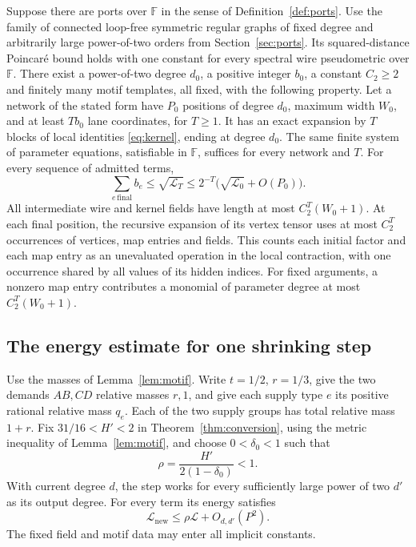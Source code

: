 \begin{theorem}\label{thm:compressor}
Suppose there are ports over $\mathbb F$ in the sense of
Definition~\ref{def:ports}. Use the family of connected loop-free symmetric regular
graphs of fixed degree and arbitrarily large power-of-two orders from
Section~\ref{sec:ports}. Its squared-distance Poincar\'e bound holds
with one constant for every spectral wire pseudometric over $\mathbb F$.
There exist a
power-of-two degree $d_0$, a positive integer $b_0$, a constant $C_2\ge2$
and finitely many motif templates, all fixed, with the following property.
Let a network of the stated form have $P_0$ positions of degree $d_0$,
maximum width $W_0$, and at least $Tb_0$ lane coordinates, for $T\ge1$.
It has an exact expansion by $T$ blocks of local identities
\eqref{eq:kernel}, ending at degree $d_0$. The same finite system of
parameter equations, satisfiable in $\mathbb F$, suffices for every network and $T$.
For every sequence of admitted terms,
\begin{equation}\label{eq:compress-bound}
  \sum_{e\,\mathrm{final}} b_e\le\sqrt{\mathcal L_T}
  \le 2^{-T}\big(\sqrt{\mathcal L_0}+O(P_0)\big).
\end{equation}
All intermediate wire and kernel fields have length at most
$C_2^T(W_0+1)$. At each final position, the recursive expansion of its
vertex tensor uses at most $C_2^T$ occurrences of vertices, map entries
and fields. This counts each initial factor and each map entry as an
unevaluated operation in the local contraction, with one occurrence
shared by all values of its hidden indices. For fixed arguments, a nonzero map entry contributes
a monomial of parameter degree at most $C_2^T(W_0+1)$.
\end{theorem}



\subsection{The energy estimate for one shrinking step}\label{subsec:shrink}

Use the masses of Lemma~\ref{lem:motif}. Write $t=1/2$, $r=1/3$, give the
two demands $AB,CD$ relative masses $r,1$, and give each supply type $e$ its
positive rational relative mass $q_e$. Each of the two supply groups has
total relative mass $1+r$. Fix $31/16<H'<2$ in Theorem~\ref{thm:conversion},
using the metric inequality of Lemma~\ref{lem:motif}, and choose $0<\delta_0<1$ such that
\[
                  \rho=\frac{H'}{2(1-\delta_0)}<1.
\]
With current degree $d$, the step works for every sufficiently large
power of two $d'$ as its output degree. For every term its energy satisfies
\begin{equation}\label{eq:compress-shrink}
        \mathcal L_{\mathrm{new}}\le \rho\mathcal L+O_{d,d'}(P^2).
\end{equation}
The fixed field and motif data may enter all implicit constants.

